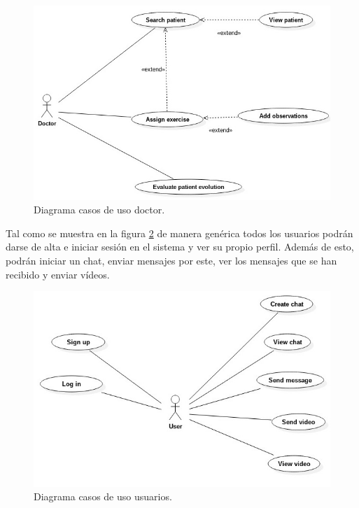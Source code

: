 \begin{figure}
    \includegraphics[width=\linewidth]{./images/requisites/use-case-doctor.jpeg}
    \caption{Diagrama casos de uso doctor.}
    \label{casos-de-uso-doctor}
\end{figure}

\medskip
Tal como se muestra en la figura \ref{casos-de-uso-usuarios} de manera genérica todos los
usuarios podrán darse de alta e iniciar sesión en el sistema y ver su propio perfil. Además
de esto, podrán iniciar un chat, enviar mensajes por este, ver los mensajes que se han recibido
y enviar vídeos.

\begin{figure}
    \includegraphics[width=\linewidth]{./images/requisites/use-case-user.jpeg}
    \caption{Diagrama casos de uso usuarios.}
    \label{casos-de-uso-usuarios}
\end{figure}

